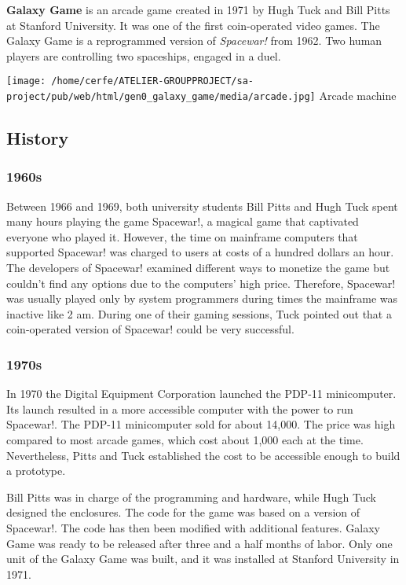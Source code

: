 \documentclass[a4paper,10pt]{book}
\begin{document}
 
 \textbf{Galaxy Game }  is an arcade game created in 1971 by Hugh Tuck and Bill Pitts at Stanford University.
          It was one of the first coin-operated video games. 
          The Galaxy Game is a reprogrammed version of  \textit{Spacewar! } from 1962. Two human players are controlling two spaceships, engaged in a duel.  
 
 
 
 \texttt{[image: /home/cerfe/ATELIER-GROUPPROJECT/sa-project/pub/web/html/gen0\_galaxy\_game/media/arcade.jpg]}
 Arcade machine 
 
 \subsection{History }
 \subsubsection{1960s }
 
          Between 1966 and 1969, both university students Bill Pitts and Hugh Tuck spent many hours playing the game Spacewar!, a magical game that captivated everyone who played it.  
          However, the time on mainframe computers that supported Spacewar! was charged to users at costs of a hundred dollars an hour. The developers of Spacewar! examined different ways to monetize the game but couldn't find any options due to the computers' high price. 
          Therefore, Spacewar! was usually played only by system programmers during times the mainframe was inactive like 2 am. 
          During one of their gaming sessions, Tuck pointed out that a coin-operated version of Spacewar! could be very successful.
           
 \subsubsection{1970s }
 
            In 1970 the Digital Equipment Corporation launched the PDP-11 minicomputer. Its launch resulted in a more accessible computer with the power to run Spacewar!. The PDP-11 minicomputer sold for about  14,000. The price was high compared to most arcade games, which cost about  1,000 each at the time. Nevertheless, Pitts and Tuck established the cost to be accessible enough to build a prototype.
           
 
            Bill Pitts was in charge of the programming and hardware, while Hugh Tuck designed the enclosures. The code for the game was based on a version of Spacewar!. The code has then been modified with additional features. Galaxy Game was ready to be released after three and a half months of labor. 
            Only one unit of the Galaxy Game was built, and it was installed at Stanford University in 1971.
           
\end{document}
